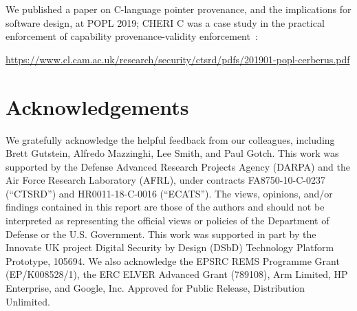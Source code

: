 \documentclass[12pt,twoside,openright,a4paper]{article}
\begin{document}
\noindent
We published a paper on C-language pointer provenance, and the implications
for software design, at POPL 2019; CHERI C was a case study in the practical
enforcement of capability provenance-validity
enforcement~\cite{cerberus-popl2019}:

\smallskip
\noindent
\url{https://www.cl.cam.ac.uk/research/security/ctsrd/pdfs/201901-popl-cerberus.pdf}
\smallskip


\section{Acknowledgements}

We gratefully acknowledge the helpful feedback from our colleagues, including
Brett Gutstein, Alfredo Mazzinghi, Lee Smith, and Paul Gotch.
This work was supported by the Defense Advanced Research Projects Agency (DARPA) and the Air Force Research Laboratory (AFRL), under contracts
FA8750-10-C-0237 (``CTSRD'') and HR0011-18-C-0016 (``ECATS'').
The views, opinions, and/or findings contained in this report are those of the authors and should not be interpreted as representing the official views or policies of the Department of Defense or the U.S. Government.
This work was supported in part by the Innovate UK project Digital Security by
Design (DSbD) Technology Platform Prototype, 105694.
We also acknowledge the EPSRC REMS Programme Grant (EP/K008528/1), the
ERC ELVER Advanced Grant (789108), Arm Limited,
HP Enterprise, and Google, Inc.
Approved for Public Release, Distribution Unlimited.

\printbibliography
\end{document}
